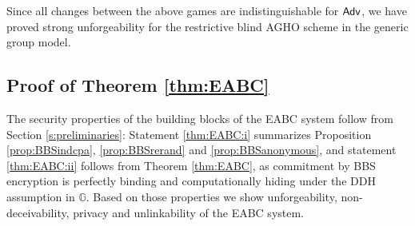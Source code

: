 Since all  changes between the above games are indistinguishable for $\mathsf{Adv}$, we have proved strong unforgeability for the restrictive blind AGHO scheme in the generic group model.





\subsection{Proof of Theorem \ref{thm:EABC}}
\label{s:proofEABC}
The security properties of the building blocks of the EABC system follow from Section \ref{s:preliminaries}:
Statement \ref{thm:EABC:i} summarizes Proposition \ref{prop:BBSindcpa}, \ref{prop:BBSrerand} and \ref{prop:BBSanonymous}, and statement \ref{thm:EABC:ii} follows from Theorem \ref{thm:EABC}, as commitment by BBS encryption is perfectly binding and computationally hiding under the DDH assumption in $\mathbb G$.
Based on those properties we show unforgeability, non-deceivability, privacy and unlinkability of the EABC system.

